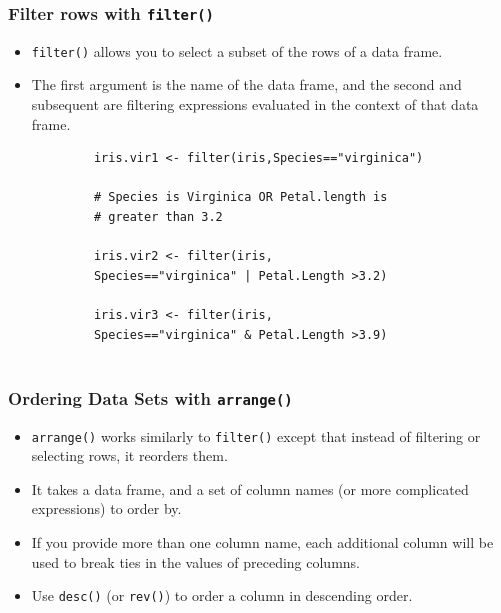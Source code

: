 \documentclass{beamer}
\begin{document}
	
	\begin{frame}
		\frametitle{Filter rows with \texttt{filter()}}
		\begin{itemize}
			\item \texttt{filter()} allows you to select a subset of the rows of a data frame. 
			\item The first argument is the name of the data frame, and the second and subsequent are filtering expressions evaluated in the context of that data frame.
		\end{itemize}
		
		
		
	\end{frame}
	\begin{frame}[fragile]	
		\begin{framed}
			\begin{verbatim}
			iris.vir1 <- filter(iris,Species=="virginica")
			
			# Species is Virginica OR Petal.length is 
			# greater than 3.2
			
			iris.vir2 <- filter(iris,
			Species=="virginica" | Petal.Length >3.2)
			
			iris.vir3 <- filter(iris,
			Species=="virginica" & Petal.Length >3.9)
			
			\end{verbatim}
		\end{framed}
	\end{frame}
	\begin{frame}
		\frametitle{Ordering Data Sets with \texttt{arrange()}}
		\begin{itemize}
			\item \texttt{arrange()} works similarly to \texttt{filter()} except that instead of filtering or selecting rows, it reorders them. 
			
			\item It takes a data frame, and a set of column names (or more complicated expressions) to order by.
			
			\item If you provide more than one column name, each additional column will be used to break ties in the values of preceding columns.
			
			\item Use \texttt{desc()} (or \texttt{rev()}) to order a column in descending order.
			
		\end{itemize}
	\end{frame}
\end{document}
